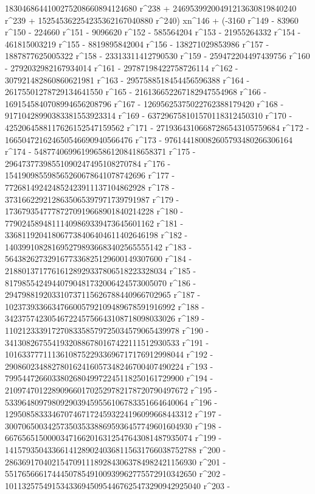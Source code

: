        1830468644100275208660894124680 r^238 + 
       24695399200491213630819840240 r^239 + 
       152545362254235362167040880 r^240) xn^146 + (-3160 r^149 - 
       83960 r^150 - 224660 r^151 - 9096620 r^152 - 585564204 r^153 - 
       21955264332 r^154 - 461815003219 r^155 - 8819895842004 r^156 - 
       138271029853986 r^157 - 1887877625005322 r^158 - 
       23313311412790530 r^159 - 259472204497439756 r^160 - 
       2792032982167934014 r^161 - 29787198422758726114 r^162 - 
       307921482860860621981 r^163 - 2957588518454456596388 r^164 - 
       26175501278729134641550 r^165 - 
       216136652267182947554968 r^166 - 
       1691545840708994656208796 r^167 - 
       12695625375022762388179420 r^168 - 
       91710428990383381553923314 r^169 - 
       637296758101570118312450310 r^170 - 
       4252064588117626152547159562 r^171 - 
       27193643106687286543105759684 r^172 - 
       166504721624650546690940566476 r^173 - 
       976144180082605793480266306164 r^174 - 
       5487740699619965861208418658371 r^175 - 
       29647377398551090247495108270784 r^176 - 
       154190985598565260678641078742696 r^177 - 
       772681492424852423911137104862928 r^178 - 
       3731662292128635065397971739791987 r^179 - 
       17367935477787270919668901840214228 r^180 - 
       77902458948111409869339473645601162 r^181 - 
       336811920418067738406404611402646198 r^182 - 
       1403991082816952798936683402565555142 r^183 - 
       5643826273291677336825129600149307600 r^184 - 
       21880137177616128929337806518223328034 r^185 - 
       81798554249440790481732006424573005070 r^186 - 
       294798819203310737115626788440966702965 r^187 - 
       1023739336634766005792109489678591916992 r^188 - 
       3423757423054672245756643108718098033026 r^189 - 
       11021233391727083358579725034579065439978 r^190 - 
       34130826755419320886780167422111512930533 r^191 - 
       101633777111361087522933696717176912998044 r^192 - 
       290860234882780162416057348246700407490224 r^193 - 
       799544726603380268049972245118250161729900 r^194 - 
       2109747012289096601702529782178720790497672 r^195 - 
       5339648097980929039459556106783351664640064 r^196 - 
       12950858333467074671724593224196099668443312 r^197 - 
       30070650034257350353388695936457749601604930 r^198 - 
       66765651500003471662016312547643081487935074 r^199 - 
       141579350433661412890240368115631766038752788 r^200 - 
       286369170402154709111892843063784982421156930 r^201 - 
       551765666174445078549100939962775572910342650 r^202 - 
       1011325754915343369450954467625473290942925040 r^203 - 
